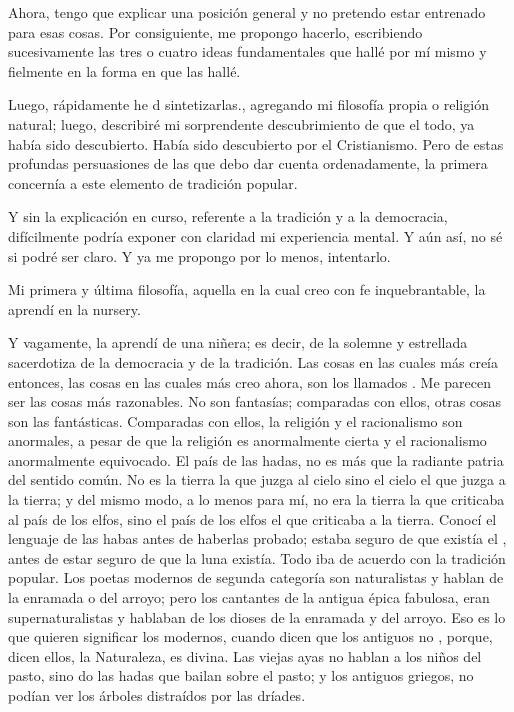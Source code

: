 Ahora, tengo que explicar una posición general y no pretendo estar entrenado para esas cosas. Por
consiguiente, me propongo hacerlo, escribiendo sucesivamente las tres o cuatro ideas fundamentales que
hallé por mí mismo y fielmente en la forma en que las hallé.

Luego, rápidamente he d sintetizarlas., agregando mi filosofía propia o religión natural; luego,
describiré mi sorprendente descubrimiento de que el todo, ya había sido descubierto. Había sido
descubierto por el Cristianismo. Pero de estas profundas persuasiones de las que debo dar cuenta
ordenadamente, la primera concernía a este elemento de tradición popular.

Y sin la explicación en curso, referente a la tradición y a la democracia, difícilmente podría exponer
con claridad mi experiencia mental. Y aún así, no sé si podré ser claro. Y ya me propongo por lo menos,
intentarlo.

Mi primera y última filosofía, aquella en la cual creo con fe inquebrantable, la aprendí en la nursery.

Y vagamente, la aprendí de una niñera; es decir, de la solemne y estrellada sacerdotiza de la
democracia y de la tradición. Las cosas en las cuales más creía entonces, las cosas en las cuales más creo
ahora, son los llamados .
Me parecen ser las cosas más razonables. No son fantasías; comparadas con ellos, otras cosas son
las fantásticas. Comparadas con ellos, la religión y el racionalismo son anormales, a pesar de que la
religión es anormalmente cierta y el racionalismo anormalmente equivocado. El país de las hadas, no es
más que la radiante patria del sentido común. No es la tierra la que juzga al cielo sino el cielo el que juzga
a la tierra; y del mismo modo, a lo menos para mí, no era la tierra la que criticaba al país de los elfos, sino
el país de los elfos el que criticaba a la tierra. Conocí el lenguaje de las habas antes de haberlas probado;
estaba seguro de que existía el , antes de estar seguro de que la luna existía. Todo iba
de acuerdo con la tradición popular. Los poetas modernos de segunda categoría son naturalistas y hablan
de la enramada o del arroyo; pero los cantantes de la antigua épica fabulosa, eran supernaturalistas y
hablaban de los dioses de la enramada y del arroyo. Eso es lo que quieren significar los modernos, cuando
dicen que los antiguos no , porque, dicen ellos, la Naturaleza, es divina. Las
viejas ayas no hablan a los niños del pasto, sino do las hadas que bailan sobre el pasto; y los antiguos
griegos, no podían ver los árboles distraídos por las dríades.

